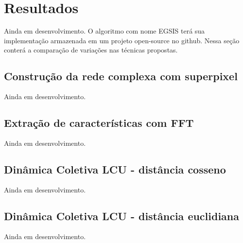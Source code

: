 \chapter{Resultados}
\label{chap:resultados}

Ainda em desenvolvimento. O algoritmo com nome EGSIS terá sua
implementação armazenada em um projeto open-source no github. Nessa
seção conterá a comparação de variações nas técnicas propostas.


\section{Construção da rede complexa com superpixel}
\label{sec:resultados-rede-complexa-superpixel}

Ainda em desenvolvimento.


\section{Extração de características com FFT}
\label{sec:resultados-extracao-de-caracteristicas--fft}

Ainda em desenvolvimento.


\section{Dinâmica Coletiva LCU - distância cosseno }
\label{sec:resultados-dinamica-coletiva-lcu-cos}

Ainda em desenvolvimento.

\section{Dinâmica Coletiva LCU - distância euclidiana}
\label{sec:resultados-dinamica-coletiva-euclidiana}

Ainda em desenvolvimento.
